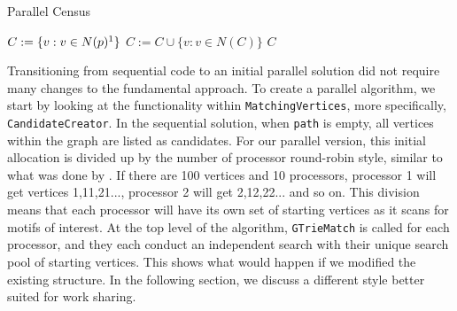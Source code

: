 \documentclass[12pt,twoside]{reedthesis}
\begin{document}
\begin{algorithm}
\caption{Parallel Census}\label{alg:cap}

\begin{algorithmic}[1]
    \EndFor
\Else
    \State $C := \{v : v \in N{(p)}\footnote{The notation N(q) represents the neighbors of q not already in \texttt{p}} \}$
    \State $C := C \cup \{v : v \in N{(C)} \}$
    \State \Return $C$

\EndIf
\EndFunction
\end{algorithmic}
\end{algorithm}
Transitioning from sequential code to an initial parallel solution did not require many changes to the fundamental approach. To create a parallel algorithm, we start by looking at the functionality within \texttt{MatchingVertices}, more specifically, \texttt{CandidateCreator}. In the sequential solution, when \texttt{path} is empty, all vertices within the graph are listed as candidates. For our parallel version, this initial allocation is divided up by the number of processor round-robin style, similar to what was done by \citeauthor{par_t} \cite{par_t}. If there are 100 vertices and 10 processors, processor 1 will get vertices 1,11,21..., processor 2 will get 2,12,22... and so on. This division means that each processor will have its own set of starting vertices as it scans for motifs of interest. At the top level of the algorithm, \texttt{GTrieMatch} is called for each processor, and they each conduct an independent search with their unique search pool of starting vertices. This shows what would happen if we modified the existing structure. In the following section, we discuss a different style better suited for work sharing.
\end{document}
